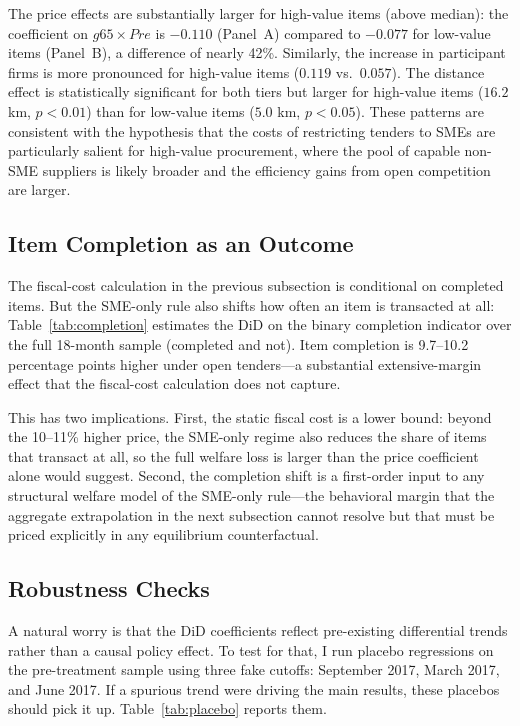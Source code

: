 

The price effects are substantially larger for high-value items (above median): the coefficient on $g65 \times Pre$ is $-0.110$ (Panel~A) compared to $-0.077$ for low-value items (Panel~B), a difference of nearly 42\%. Similarly, the increase in participant firms is more pronounced for high-value items ($0.119$ vs.\ $0.057$). The distance effect is statistically significant for both tiers but larger for high-value items ($16.2$ km, $p<0.01$) than for low-value items ($5.0$ km, $p<0.05$). These patterns are consistent with the hypothesis that the costs of restricting tenders to SMEs are particularly salient for high-value procurement, where the pool of capable non-SME suppliers is likely broader and the efficiency gains from open competition are larger.

\subsection{Item Completion as an Outcome}

The fiscal-cost calculation in the previous subsection is conditional on completed items. But the SME-only rule also shifts how often an item is transacted at all: Table~\ref{tab:completion} estimates the DiD on the binary completion indicator over the full 18-month sample (completed and not). Item completion is 9.7--10.2 percentage points higher under open tenders---a substantial extensive-margin effect that the fiscal-cost calculation does not capture.



This has two implications. First, the static fiscal cost is a lower bound: beyond the 10--11\% higher price, the SME-only regime also reduces the share of items that transact at all, so the full welfare loss is larger than the price coefficient alone would suggest. Second, the completion shift is a first-order input to any structural welfare model of the SME-only rule---the behavioral margin that the aggregate extrapolation in the next subsection cannot resolve but that must be priced explicitly in any equilibrium counterfactual.

\subsection{Robustness Checks}

A natural worry is that the DiD coefficients reflect pre-existing differential trends rather than a causal policy effect. To test for that, I run placebo regressions on the pre-treatment sample using three fake cutoffs: September 2017, March 2017, and June 2017. If a spurious trend were driving the main results, these placebos should pick it up. Table~\ref{tab:placebo} reports them.

